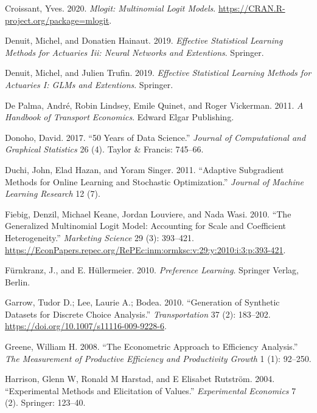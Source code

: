 \documentclass[12pt,]{article}
\begin{document}
\leavevmode\hypertarget{ref-R-mlogit}{}%
Croissant, Yves. 2020. \emph{Mlogit: Multinomial Logit Models}.
\url{https://CRAN.R-project.org/package=mlogit}.

\leavevmode\hypertarget{ref-denuit2019as3}{}%
Denuit, Michel, and Donatien Hainaut. 2019. \emph{Effective Statistical
Learning Methods for Actuaries Iii: Neural Networks and Extentions}.
Springer.

\leavevmode\hypertarget{ref-denuit2019as1}{}%
Denuit, Michel, and Julien Trufin. 2019. \emph{Effective Statistical
Learning Methods for Actuaries I: GLMs and Extentions}. Springer.

\leavevmode\hypertarget{ref-depalma2011tr}{}%
De Palma, André, Robin Lindsey, Emile Quinet, and Roger Vickerman. 2011.
\emph{A Handbook of Transport Economics}. Edward Elgar Publishing.

\leavevmode\hypertarget{ref-donoho2017ds}{}%
Donoho, David. 2017. ``50 Years of Data Science.'' \emph{Journal of
Computational and Graphical Statistics} 26 (4). Taylor \& Francis:
745--66.

\leavevmode\hypertarget{ref-duchi2011adaptive}{}%
Duchi, John, Elad Hazan, and Yoram Singer. 2011. ``Adaptive Subgradient
Methods for Online Learning and Stochastic Optimization.'' \emph{Journal
of Machine Learning Research} 12 (7).

\leavevmode\hypertarget{ref-fiebig2010gmlm}{}%
Fiebig, Denzil, Michael Keane, Jordan Louviere, and Nada Wasi. 2010.
``The Generalized Multinomial Logit Model: Accounting for Scale and
Coefficient Heterogeneity.'' \emph{Marketing Science} 29 (3): 393--421.
\url{https://EconPapers.repec.org/RePEc:inm:ormksc:v:29:y:2010:i:3:p:393-421}.

\leavevmode\hypertarget{ref-furnkranz2011p}{}%
Fürnkranz, J., and E. Hüllermeier. 2010. \emph{Preference Learning}.
Springer Verlag, Berlin.

\leavevmode\hypertarget{ref-garrow2010gs}{}%
Garrow, Tudor D.; Lee, Laurie A.; Bodea. 2010. ``Generation of Synthetic
Datasets for Discrete Choice Analysis.'' \emph{Transportation} 37 (2):
183--202. \url{https://doi.org/10.1007/s11116-009-9228-6}.

\leavevmode\hypertarget{ref-greene2008econometric}{}%
Greene, William H. 2008. ``The Econometric Approach to Efficiency
Analysis.'' \emph{The Measurement of Productive Efficiency and
Productivity Growth} 1 (1): 92--250.

\leavevmode\hypertarget{ref-harrison2004experimental}{}%
Harrison, Glenn W, Ronald M Harstad, and E Elisabet Rutström. 2004.
``Experimental Methods and Elicitation of Values.'' \emph{Experimental
Economics} 7 (2). Springer: 123--40.
\end{document}
